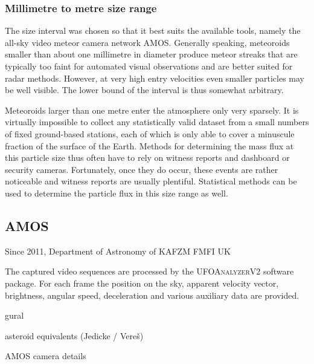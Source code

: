         \subsubsection{Millimetre to metre size range} \label{imr}
            The size interval was chosen so that it best suits the available tools, namely the all-sky video meteor camera network AMOS.
            Generally speaking, meteoroids smaller than about one millimetre in diameter produce
            meteor streaks that are typically too faint for automated visual observations and are better suited for radar methods.
            However, at very high entry velocities even smaller particles may be well visible. The lower bound of the interval is thus somewhat arbitrary.

            Meteoroids larger than one metre enter the atmosphere only very sparsely. It is virtually impossible to collect any statistically valid
            dataset from a small numbers of fixed ground-based stations, each of which is only able to cover a minuscule fraction of the surface of the Earth. 
            Methods for determining the mass flux at this particle size thus often have to rely on witness reports and dashboard or security cameras.
            Fortunately, once they do occur, these events are rather noticeable and witness reports are usually plentiful.
            Statistical methods can be used to determine the particle flux in this size range as well.

    \subsection{AMOS}
        Since 2011, Department of Astronomy of KAFZM FMFI UK
        
        The captured video sequences are processed by the \textsc{UFOAnalyzerV2} software package.
        For each frame the position on the sky, apparent velocity vector, brightness, angular
        speed, deceleration and various auxiliary data are provided.
        
        
gural

asteroid equivalents (Jedicke / Vereš)

AMOS camera details \cite{zigo2013}